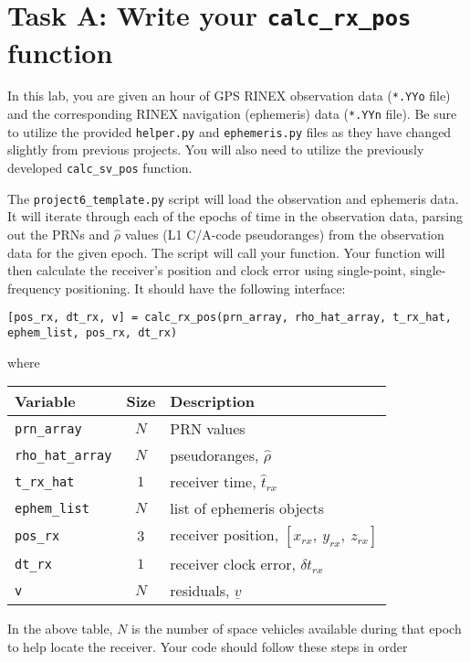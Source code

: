 \documentclass[12pt]{article}
\renewcommand{\vec}[1]     {\underline{#1}}
\begin{document}
\section*{\textsf{Task A: Write your \lstinline{calc_rx_pos} function}}

In this lab, you are given an hour of GPS RINEX observation data (\lstinline{*.YYo} file) and
the corresponding RINEX navigation (ephemeris) data (\lstinline{*.YYn} file).  Be sure 
to utilize the provided \lstinline{helper.py} and \lstinline{ephemeris.py} files as they have 
changed slightly from previous projects.  You will also need to utilize the previously 
developed \lstinline{calc_sv_pos} function.


The \lstinline{project6_template.py} script will load the observation and
ephemeris data.  It will iterate through each of the epochs of time in the
observation data, parsing out the PRNs and $\hat{\rho}$ values (L1 C/A-code
pseudoranges) from the observation data for the given epoch.  The script will
call your function.  Your function will then calculate the receiver's position
and clock error using single-point, single-frequency positioning.  It should
have the following interface:
\begin{lstlisting}
[pos_rx, dt_rx, v] = calc_rx_pos(prn_array, rho_hat_array, t_rx_hat, ephem_list, pos_rx, dt_rx)
\end{lstlisting}
where
\begin{center}
   \begin{tabular}{l|c|l}
      Variable & Size & Description \\
      \hline
      \texttt{prn\_array}         & $N$ & PRN values \\
      \texttt{rho\_hat\_array}    & $N$ & pseudoranges, $\hat{\rho}$ \\
      \texttt{t\_rx\_hat}  & $1$ & receiver time, $\hat{t}_{rx}$ \\
	\texttt{ephem\_list}  & $N$ & list of ephemeris objects \\
      \texttt{pos\_rx}     & $3$ & receiver position,
         $[x_{rx},\ y_{rx},\ z_{rx}]$ \\
      \texttt{dt\_rx}      & $1$ & receiver clock error,
         $\delta t_{rx}$ \\
      \texttt{v}           & $N$ & residuals, $\vec{v}$
   \end{tabular}
\end{center}
In the above table, $N$ is the number of space vehicles available during that
epoch to help locate the receiver.  Your code should follow these steps in order
\end{document}
